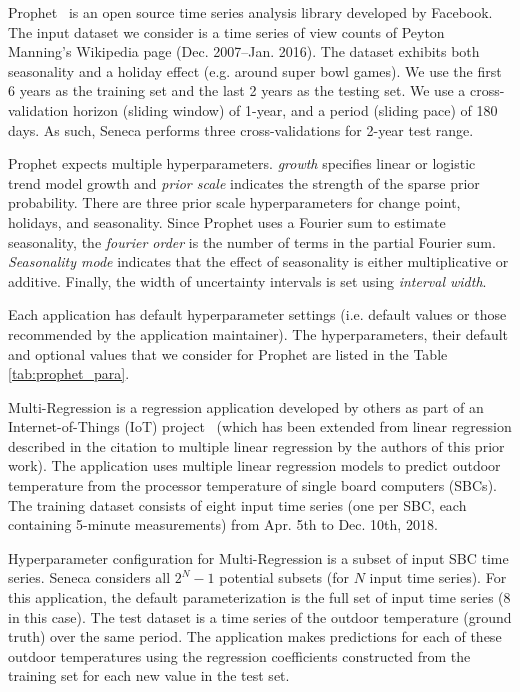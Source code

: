 Prophet~\cite{ref:prophet} is an open source time series analysis library developed
by Facebook.  The input dataset we consider is a time series of view counts
of Peyton Manning's Wikipedia page (Dec. 2007--Jan. 2016).
The dataset exhibits both seasonality and a holiday effect (e.g. around 
super bowl games).  We use the first 6 years as the training set 
and the last 2 years as the testing set.  We use a cross-validation 
horizon (sliding window) of 1-year, and a period (sliding pace) 
of 180 days.  As such, Seneca performs three cross-validations for 2-year test range.

Prophet expects multiple hyperparameters.
\textit{growth} specifies linear or logistic trend model growth and \textit{prior scale} indicates the strength of the sparse prior probability. There are three prior scale hyperparameters for change point, holidays, and seasonality. Since Prophet uses a Fourier sum to estimate seasonality, the \textit{fourier order} is the number of terms in the partial Fourier sum. \textit{Seasonality mode} indicates that the effect of seasonality is either multiplicative or additive. Finally, the width of uncertainty intervals is set using \textit{interval width}.

Each application has default hyperparameter settings (i.e. default values or those recommended by the application maintainer). The hyperparameters, their default and optional values that we consider for Prophet are listed in the Table \ref{tab:prophet_para}.

Multi-Regression is a regression application developed by others as part of
an Internet-of-Things (IoT) project~\cite{iot-cpu} (which has been
extended from linear regression described in the citation 
to multiple linear regression by the authors of this prior work).
The application uses multiple linear regression models
to predict outdoor temperature from the processor 
temperature of single board computers (SBCs).  
The training dataset consists of eight input time 
series (one per SBC, each containing 
5-minute measurements) from Apr. 5th to Dec. 10th, 2018.

Hyperparameter configuration for Multi-Regression is a subset of input SBC time series.
Seneca considers all \texttt{$2^N - 1$} potential subsets (for $N$ input time series).
For this application, the default parameterization is the 
full set of input time series (8 in this case).
The test dataset is a time 
series of the outdoor temperature (ground truth) 
over the same period.  
The application makes 
predictions for each of these outdoor temperatures
using the regression coefficients constructed from the training set
for each new value in the test set.

